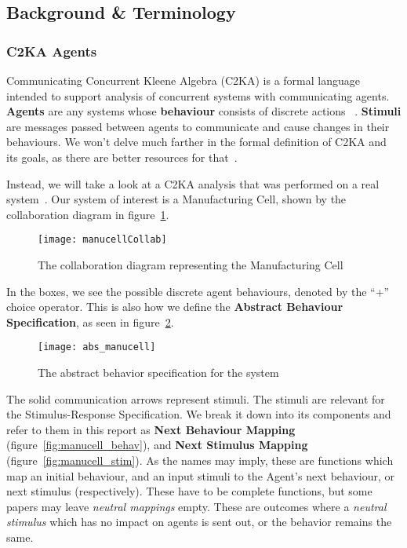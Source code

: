\subsection{Background \& Terminology}\label{subsec:background-&-terminology}
\subsubsection{C2KA Agents}\label{subsubsec:c2ka-agents}
Communicating Concurrent Kleene Algebra (C2KA) is a formal language intended to support analysis of concurrent systems with communicating agents. %
\textbf{Agents} are any systems whose \textbf{behaviour} consists of discrete actions ~\cite{c2ka_foundations}.
\textbf{Stimuli} are messages passed between agents to communicate and cause changes in their behaviours.
We won't delve much farther in the formal definition of C2KA and its goals,
as there are better resources for that~\cite{c2ka_foundations, implicit_interactions}.

Instead, we will take a look at a C2KA analysis that was performed on a real system~\cite{manu_cell}.
Our system of interest is a Manufacturing Cell, shown by the collaboration diagram in figure~\ref{fig:manucell-collab}.
\begin{figure}
    \centering
    \texttt{[image: manucellCollab]}
    \caption{The collaboration diagram representing the Manufacturing Cell~\cite{manu_cell}}
    \label{fig:manucell-collab}
\end{figure}

In the boxes, we see the possible discrete agent behaviours, denoted by the ``+'' choice operator.
This is also how we define the \textbf{Abstract Behaviour Specification}, as seen in figure~\ref{fig:abstractmc}.
\begin{figure}
    \centering
    \texttt{[image: abs\_manucell]}
    \caption{The abstract behavior specification for the system~\cite{manu_cell}}
    \label{fig:abstractmc}
\end{figure}

The solid communication arrows represent stimuli.
The stimuli are relevant for the Stimulus-Response Specification.
We break it down into its components and refer to them in this report as \textbf{Next Behaviour Mapping} (figure~\ref{fig:manucell_behav}),
and \textbf{Next Stimulus Mapping} (figure~\ref{fig:manucell_stim}).
As the names may imply, these are functions which map an initial behaviour, and an input stimuli to the Agent's next behaviour, or next stimulus (respectively).
These have to be complete functions, but some papers may leave \textit{neutral mappings} empty.
These are outcomes where a \textit{neutral stimulus} which has no impact on agents is sent out, or the behavior remains the same.

